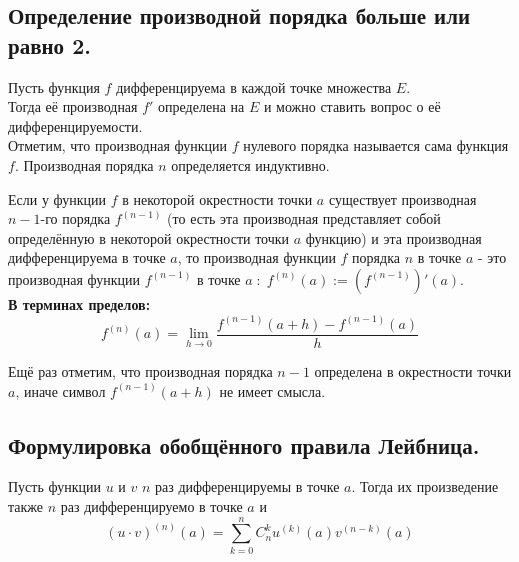 

\label{sec_Definition15}
\begin{definition}
    \subsection*{Определение производной порядка больше или равно 2.}
    Пусть функция $f$ дифференцируема в каждой точке множества $E$. \\
    Тогда её производная $f'$ определена на $E$ и можно ставить вопрос о её 
    дифференцируемости. \\
    Отметим, что производная функции $f$ нулевого порядка называется сама функция $f$.
    Производная порядка $n$ определяется индуктивно.
    \begin{note}[purple]
        Если у функции $f$ в некоторой окрестности точки $a$ существует производная
        $n - 1$-го порядка $f^{(n - 1)}$ (то есть эта производная представляет собой
        определённую в некоторой окрестности точки $a$ функцию) и эта производная 
        дифференцируема в точке $a$, то производная функции $f$ порядка $n$ в точке $a$ - 
        это производная функции $f^{(n - 1)}$ в точке $a \; : \; f^{(n)}(a) := (f^{(n - 1)})'(a)$. \\

        \textbf{В терминах пределов:}
        $$ 
            f^{(n)}(a) = \lim_{h \rightarrow 0} \frac{f^{(n - 1)}(a + h) - f^{(n - 1)}(a)}{h}
        $$

        Ещё раз отметим, что производная порядка $n - 1$ определена в окрестности точки $a$, 
        иначе символ $f^{(n - 1)} (a + h)$ не имеет смысла.
    \end{note}

    \subsection*{Формулировка обобщённого правила Лейбница.}
    \begin{note}[purple]
        Пусть функции $u$ и $v$ $n$ раз дифференцируемы в точке $a$. 
        Тогда их произведение также $n$ раз дифференцируемо в точке $a$ и
        $$ (u \cdot v)^{(n)} (a) = \sum_{k = 0}^{n} C_n^k u^{(k)} (a) v^{(n - k)}(a) $$
    \end{note}
\end{definition}